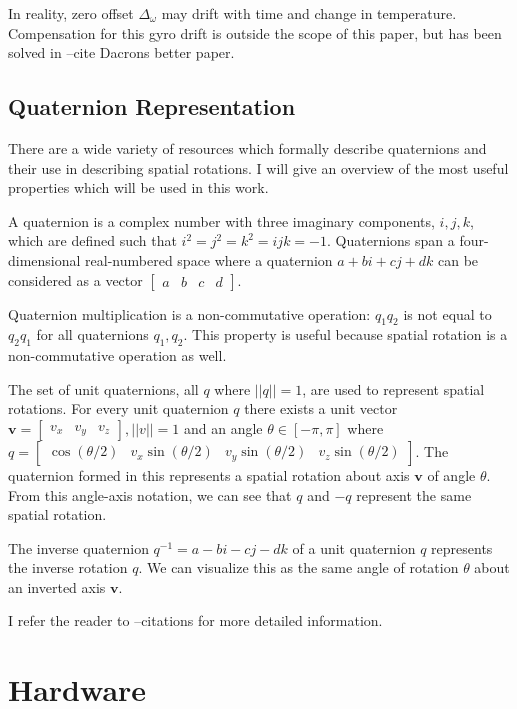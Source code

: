 \documentclass[12pt]{report}
\begin{document}
In reality, zero offset $\Delta_\omega$ may drift with time and change in temperature. Compensation for this gyro drift is outside the scope of this paper, but has been solved in --cite Dacrons better paper.

\subsection{Quaternion Representation}

There are a wide variety of resources which formally describe quaternions and their use in describing spatial rotations. I will give an overview of the most useful properties which will be used in this work.

A quaternion is a complex number with three imaginary components, $i,j,k$, which are defined such that $i^2 = j^2 = k^2 = ijk = -1$. Quaternions span a four-dimensional real-numbered space where a quaternion $a + b i + c j + d k$ can be considered as a vector $\begin{bmatrix}a & b & c & d \end{bmatrix}$. 

Quaternion multiplication is a non-commutative operation: $q_1 q_2$ is not equal to $q_2 q_1$ for all quaternions $q_1, q_2$. This property is useful because spatial rotation is a non-commutative operation as well.

The set of unit quaternions, all $q$ where $ ||q|| = 1$, are used to represent spatial rotations. For every unit quaternion $q$ 
there exists a unit vector $\mathbf{v} = \begin{bmatrix} v_x & v_y & v_z \end{bmatrix}, ||v|| = 1$ 
and an angle $\theta \in [-\pi, \pi]$ where 
$q = \begin{bmatrix} \cos (\theta/2) & v_x \sin (\theta/2) & v_y \sin (\theta/2) & v_z \sin (\theta/2)\end{bmatrix}$. The quaternion formed in this represents a spatial rotation about axis $\mathbf{v}$ of angle $\theta$. 
From this angle-axis notation, we can see that $q$ and $-q$ represent the same spatial rotation. 

The inverse quaternion $q^{-1} = a - bi - cj - dk$ of a unit quaternion $q$ represents the inverse rotation $q$. We can visualize this as the same angle of rotation $\theta$ about an inverted axis $\mathbf{v}$.

I refer the reader to --citations for more detailed information.

\section{Hardware}
\end{document}
